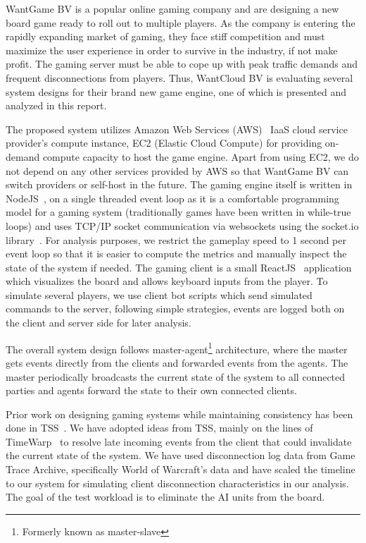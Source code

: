 \documentclass[a4paper]{IEEEtran}
\begin{document}
  WantGame BV is a popular online gaming company and are designing a new board game ready to roll out to multiple players. As the company is entering the rapidly expanding market of gaming, they face stiff competition and must maximize the user experience in order to survive in the industry, if not make profit. The gaming server must be able to cope up with peak traffic demands and frequent disconnections from players. Thus, WantCloud BV is evaluating several system designs for their brand new game engine, one of which is presented and analyzed in this report.
  
  The proposed system utilizes Amazon Web Services (AWS)~\cite{aws} IaaS cloud service provider's compute instance, EC2 (Elastic Cloud Compute) for providing on-demand compute capacity to host the game engine.
  Apart from using EC2, we do not depend on any other services provided by AWS so that WantGame BV can switch providers or self-host in the future. The gaming engine itself is written in NodeJS~\cite{nodejs}, on a single threaded event loop as it is a comfortable programming model for a gaming system (traditionally games have been written in while-true loops) and uses TCP/IP socket communication via websockets using the socket.io library~\cite{socket.io}. For analysis purposes, we restrict the gameplay speed to 1 second per event loop so that it is easier to compute the metrics and manually inspect the state of the system if needed. The gaming client is a small ReactJS~\cite{ReactJS} application which visualizes the board and allows keyboard inputs from the player. To simulate several players, we use client bot scripts which send simulated commands to the server, following simple strategies, events are logged both on the client and server side for later analysis.
  
  The overall system design follows master-agent\footnote{Formerly known as master-slave} architecture, where the master gets events directly from the clients and forwarded events from the agents. The master periodically broadcasts the current state of the system to all connected parties and agents forward the state to their own connected clients.

  Prior work on designing gaming systems while maintaining consistency has been done in TSS~\cite{TSS}. We have adopted ideas from TSS, mainly on the lines of TimeWarp~\cite{timewarp} to resolve late incoming events from the client that could invalidate the current state of the system. We have used disconnection log data from Game Trace Archive, specifically World of Warcraft's data and have scaled the timeline to our system for simulating client disconnection characteristics in our analysis. The goal of the test workload is to eliminate the AI units from the board.
  
\end{document}

